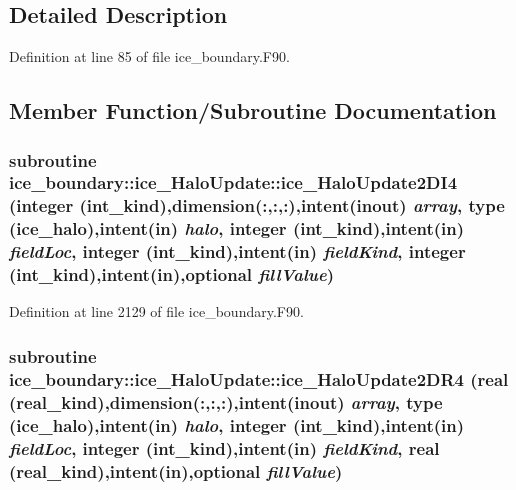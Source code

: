 \subsection{Detailed Description}


Definition at line 85 of file ice\_\-boundary.F90.

\subsection{Member Function/Subroutine Documentation}
\hypertarget{interfaceice__boundary_1_1ice__HaloUpdate_ac6180f0c3cd53da8017c494719f21f3e}{
\subsubsection[{ice\_\-HaloUpdate2DI4}]{\setlength{\rightskip}{0pt plus 5cm}subroutine ice\_\-boundary::ice\_\-HaloUpdate::ice\_\-HaloUpdate2DI4 (integer (int\_\-kind),dimension(:,:,:),intent(inout) {\em array}, \/  type ({\bf ice\_\-halo}),intent(in) {\em halo}, \/  integer (int\_\-kind),intent(in) {\em fieldLoc}, \/  integer (int\_\-kind),intent(in) {\em fieldKind}, \/  integer (int\_\-kind),intent(in),optional {\em fillValue})}}
\label{interfaceice__boundary_1_1ice__HaloUpdate_ac6180f0c3cd53da8017c494719f21f3e}


Definition at line 2129 of file ice\_\-boundary.F90.\hypertarget{interfaceice__boundary_1_1ice__HaloUpdate_a6e0330dfb47b323f627d0794a8ce828e}{
\subsubsection[{ice\_\-HaloUpdate2DR4}]{\setlength{\rightskip}{0pt plus 5cm}subroutine ice\_\-boundary::ice\_\-HaloUpdate::ice\_\-HaloUpdate2DR4 (real (real\_\-kind),dimension(:,:,:),intent(inout) {\em array}, \/  type ({\bf ice\_\-halo}),intent(in) {\em halo}, \/  integer (int\_\-kind),intent(in) {\em fieldLoc}, \/  integer (int\_\-kind),intent(in) {\em fieldKind}, \/  real (real\_\-kind),intent(in),optional {\em fillValue})}}
\label{interfaceice__boundary_1_1ice__HaloUpdate_a6e0330dfb47b323f627d0794a8ce828e}


